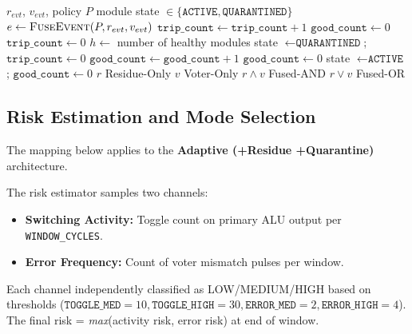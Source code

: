 \documentclass[conference]{IEEEtran}
\begin{document}
\begin{algorithm}[t]
\caption{Per-Module Quarantine State Policy}
\label{alg:quarantine_policy}
\footnotesize
\begin{algorithmic}[1]
\Require $r_{evt}$, $v_{evt}$, policy $P$
\Ensure module state $\in \{\texttt{ACTIVE},\texttt{QUARANTINED}\}$
\State $e \gets \textsc{FuseEvent}(P,r_{evt},v_{evt})$
    \State $\texttt{trip\_count} \gets \texttt{trip\_count}+1$
    \State $\texttt{good\_count} \gets 0$
  \Else
    \State $\texttt{trip\_count} \gets 0$
  \EndIf
  \State $h \gets$ number of healthy modules
    \State state $\gets \texttt{QUARANTINED}$; $\texttt{trip\_count} \gets 0$
  \EndIf
\Else
    \State $\texttt{good\_count} \gets \texttt{good\_count}+1$
  \Else
    \State $\texttt{good\_count} \gets 0$
  \EndIf
    \State state $\gets \texttt{ACTIVE}$; $\texttt{good\_count} \gets 0$
  \EndIf
\EndIf
\Statex
{}
   \State \Return $r$ \Comment Residue-Only
   \State \Return $v$ \Comment Voter-Only
   \State \Return $r \land v$ \Comment Fused-AND
  \Else \State \Return $r \lor v$ \Comment Fused-OR
  \EndIf
\EndFunction
\end{algorithmic}
\end{algorithm}

\subsection{Risk Estimation and Mode Selection}

The mapping below applies to the \textbf{Adaptive (+Residue +Quarantine)} architecture.

The risk estimator samples two channels:
\begin{itemize}
  \item \textbf{Switching Activity:} Toggle count on primary ALU output per \texttt{WINDOW\_CYCLES}.
  \item \textbf{Error Frequency:} Count of voter mismatch pulses per window.
\end{itemize}

Each channel independently classified as LOW/MEDIUM/HIGH based on thresholds 
($\texttt{TOGGLE\_MED}=10, \texttt{TOGGLE\_HIGH}=30, \texttt{ERROR\_MED}=2, \texttt{ERROR\_HIGH}=4$).
The final risk = \textit{max}(activity risk, error risk) at end of window.
\end{document}
